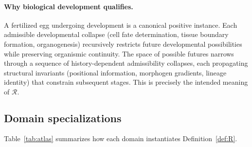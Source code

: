 \documentclass[12pt, a4paper]{article}
\theoremstyle{plain}
\theoremstyle{definition}
\theoremstyle{remark}
\newcommand{\Rcal}{\mathcal{R}}
\begin{document}
\paragraph{Why biological development qualifies.}

A fertilized egg undergoing development is a canonical
positive instance.
Each admissible developmental collapse (cell fate determination,
tissue boundary formation, organogenesis) recursively restricts
future developmental possibilities while preserving organismic
continuity.
The space of possible futures narrows through a sequence of
history-dependent admissibility collapses, each propagating
structural invariants (positional information, morphogen gradients,
lineage identity) that constrain subsequent stages.
This is precisely the intended meaning of $\Rcal$.

\subsection{Domain specializations}

Table~\ref{tab:atlas} summarizes how each domain instantiates
Definition~\ref{def:R}.
\end{document}
